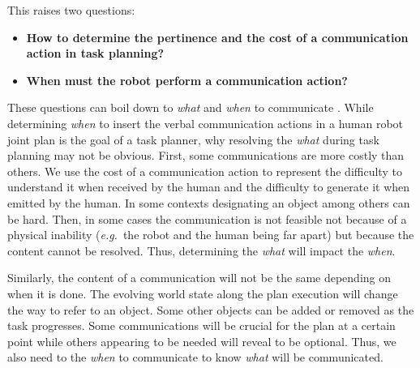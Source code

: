 \documentclass[a4paper,11pt,twoside]{StyleThese}
\begin{document}
This raises two questions:
\begin{itemize}
\item \textbf{How to determine the pertinence and the cost of a communication action in task planning?}
\item \textbf{When must the robot perform a communication action?}
\end{itemize}
These questions can boil down to \textit{what} and \textit{when} to communicate \cite{mavridis2015review}. While determining \textit{when} to insert the verbal communication actions in a human robot joint plan is the goal of a task planner, why resolving the \textit{what} during task planning may not be obvious. First, some communications are more costly than others. We use the cost of a communication action to represent the difficulty to understand it when received by the human and the difficulty to generate it when emitted by the human. In some contexts designating an object among others can be hard. Then, in some cases the communication is not feasible not because of a physical inability (\textit{e.g.}~the robot and the human being far apart) but because the content cannot be resolved. Thus, determining the \textit{what} will impact the \textit{when}.

Similarly, the content of a communication will not be the same depending on when it is done. The evolving world state along the plan execution will change the way to refer to an object. Some other objects can be added or removed as the task progresses. Some communications will be crucial for the plan at a certain point while others appearing to be needed will reveal to be optional. Thus, we also need to the \textit{when} to communicate to know \textit{what} will be communicated.
\end{document}
